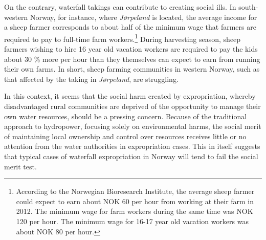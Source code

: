 On the contrary, waterfall takings can contribute to creating social ills. In south-western Norway, for instance, where {\it Jørpeland} is located, the average income for a sheep farmer corresponds to about half of the minimum wage that farmers are required to pay to full-time farm workers.\footnote{According to the Norwegian Bioresearch Institute, the average sheep farmer could expect to earn about NOK 60 per hour from working at their farm in 2012. The minimum wage for farm workers during the same time was NOK 120 per hour. The minimum wage for 16-17 year old vacation workers was about NOK 80 per hour.} During harvesting season, sheep farmers wishing to hire 16 year old vacation workers are required to pay the kids about 30 \% more per hour than they themselves can expect to earn from running their own farms. In short, sheep farming communities in western Norway, such as that affected by the taking in {\it Jørpeland}, are struggling.

In this context, it seems that the social harm created by expropriation, whereby disadvantaged rural communities are deprived of the opportunity to manage their own water resources, should be a pressing concern. Because of the traditional approach to hydropower, focusing solely on environmental harms, the social merit of maintaining local ownership and control over resources receives little or no attention from the water authorities in expropriation cases. This in itself suggests that typical cases of waterfall expropriation in Norway will tend to fail the social merit test.

